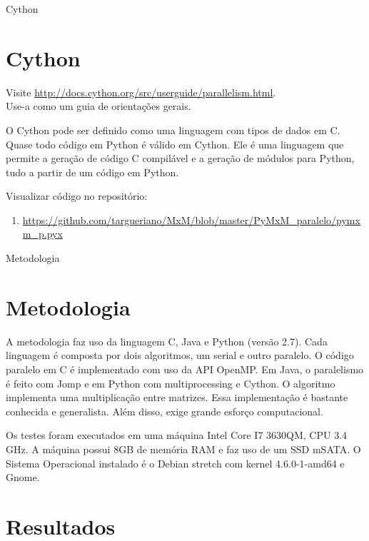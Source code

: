 \documentclass[aspectratio=169]{beamer}
\begin{document}
\begin{frame}{Cython}
\section{Cython}

Visite \url{http://docs.cython.org/src/userguide/parallelism.html}.\\ 
Use-a como um guia de orientações gerais.
\vspace{0.7cm}

O Cython pode ser definido como uma linguagem com tipos de dados em C. Quase todo código em Python é válido em Cython. Ele é uma linguagem que permite a geração de código C compilável e a geração de módulos para Python, tudo a partir de um código em Python. 

Visualizar código no repositório:
\begin{enumerate}
 \item \url{https://github.com/targueriano/MxM/blob/master/PyMxM_paralelo/pymxm_p.pyx}
\end{enumerate}


\end{frame}

\begin{frame}{Metodologia}
\section{Metodologia}

A metodologia faz uso da linguagem C, Java e Python (versão 2.7). Cada linguagem é composta por dois algoritmos, um serial e outro paralelo. O código paralelo em C é implementado com uso da API OpenMP. Em Java, o paralelismo é feito com Jomp e em Python com multiprocessing e Cython. 
O algoritmo implementa uma multiplicação entre matrizes. Essa implementação é bastante conhecida e generalista. Além disso, exige grande esforço computacional.

Os testes foram executados em uma máquina Intel Core I7 3630QM, CPU 3.4 GHz. A máquina possui 8GB de memória RAM e faz uso de um SSD mSATA. O Sistema Operacional instalado é o Debian stretch com kernel 4.6.0-1-amd64 e Gnome.

\end{frame}


\section{Resultados}
\end{document}

